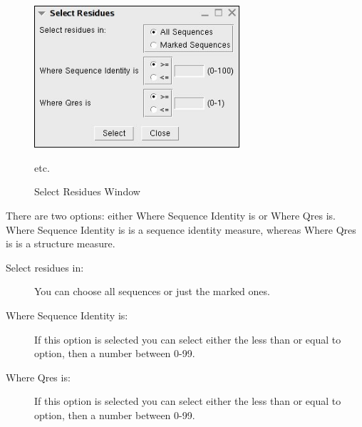 \begin{description}
\begin{figure}[here]
\centerline{\includegraphics[width=3in]{./pictures/select_residues.jpg}}
\caption{Select Residues Window}%
etc.  \label{fig:select_res} \end{figure}

There are two options: either \textsf{Where
Sequence Identity is} or \textsf{Where Qres is}.  \textsf{Where Sequence
Identity is} is a sequence identity measure, whereas \textsf{Where Qres
is} is a structure measure.

\begin{description}
     \item[Select residues in:] You can choose all sequences or just the
     marked ones.
     \item[Where Sequence Identity is:] If this option is selected you
     can select either the less than or equal to option, then a number
     between 0-99.
     \item[Where Qres is:] If this option is selected you can select
     either the less than or equal to option, then a number between
     0-99.
\end{description}
\end{description}


